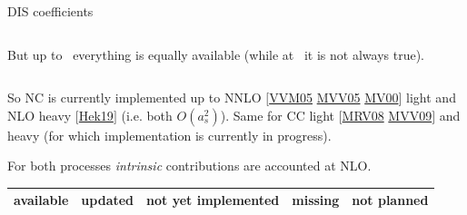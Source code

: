 \documentclass[9pt]{beamer}
\providecommand{\iRef}[1]{{\color{mLightGreen}\small $[$#1$]$}}
\begin{document}
\begin{frame}{DIS coefficients}
\begin{columns}
\begin{column}{0.4\textwidth}
            \vspace*{10pt}
            {
                \footnotesize
                But up to \nnlo\ everything is equally available (while at
                \nnnlo\ it is not always true).
            }
        \end{column}
    \end{columns}

    \vspace*{10pt}

    So NC is currently implemented up to NNLO
    \iRef{\href{https://doi.org/10.1016/j.nuclphysb.2005.06.020}{VVM05}
    \href{https://doi.org/10.1016/j.physletb.2004.11.063}{MVV05}
    \href{https://doi.org/10.1016/S0550-3213(00)00045-6}{MV00}}
    light and NLO heavy \iRef{\href{https://arxiv.org/abs/1910.01536}{Hek19}}
    (i.e. both $O(a_s^2)$).
    Same for CC light
    \iRef{\href{https://doi.org/10.1016/j.nuclphysb.2007.09.022}{MRV08}
    \href{https://doi.org/10.1016/j.nuclphysb.2009.01.001}{MVV09}} and heavy
    (for which implementation is currently in progress).

    For both processes \textit{intrinsic} contributions are accounted at NLO.
    
    \vspace*{15pt}
    {
        \footnotesize
        \begin{flushright}
            \begin{tabular}{c c c c c} 
                \cellcolor{green!25}available
                    & \cellcolor{blue!25}updated
                    &\cellcolor{yellow!25}not yet implemented
                    &\cellcolor{red!25}missing
                    & not planned\\
                \hline
            \end{tabular}
        \end{flushright}
    }
\end{frame}
\end{document}
